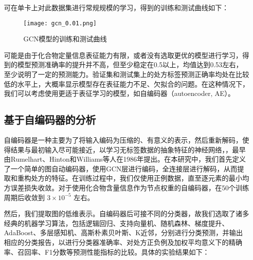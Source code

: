 可在单卡上对此数据集进行常规规模的学习，得到的训练和测试曲线如下：


\begin{figure}[H]
  \centering
  \texttt{[image: gcn\_0.01.png]}
  \caption{GCN模型的训练和测试曲线}
  \label{fig:gcn_train_curve}
\end{figure}

可能是由于化合物定量信息表征能力有限，或者没有选取更优的模型进行学习，得到的模型预测准确率的提升并不高，但至少稳定在0.5以上，均值达到0.53左右，至少说明了一定的预测能力。验证集和测试集上的处方标签预测正确率均处在比较低的水平上，大概率显示模型存在表征能力不足、欠拟合的问题。在这种情况下，我们可以考虑使用更适于表征学习的模型，如自编码器（autoencoder, AE）。

\subsection{基于自编码器的分析}

自编码器是一种主要为了将输入编码为压缩的、有意义的表示，然后重新解码，使得结果与最初输入尽可能接近，以学习无标签数据的抽象特征的神经网络，\cite{Bank_Koenigstein_Giryes_2021}，最早由Rumelhart、Hinton和Williams等人在1986年提出\cite{10.5555/104279.104293}。在本研究中，我们首先定义了一个简单的图自动编码器，使用GCN层进行编码，全连接层进行解码，从而提取和重构处方的特征。在训练过程中，我们仅使用正例数据，直至逐元素的最小均方误差损失收敛。对于使用化合物含量信息作为节点权重的自编码器，在50个训练周期后收敛到 $3\times 10^{-5}$ 左右。


然后，我们提取图的低维表示。自编码器后可接不同的分类器，故我们选取了诸多经典的机器学习算法，包括逻辑回归、支持向量机、随机森林、梯度提升、AdaBoost、多层感知机、高斯朴素贝叶斯、K近邻，分别进行分类预测，并输出相应的分类报告，以进行分类器准确率、对处方正负例及加权平均意义下的精确率、召回率、F1分数等预测性能指标的比较。具体的实验结果如下：

